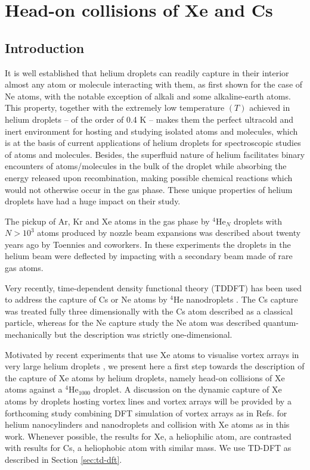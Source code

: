 \chapter{Head-on collisions of Xe and Cs}	
	\section{Introduction}\label{sec:intro-collisions}
		It is well established that helium droplets can readily capture in their interior almost any atom or molecule interacting with them, as first shown for the case of Ne atoms,\citep{Sch90} with the notable exception of alkali\citep{Sti96} and some alkaline-earth\citep{Her07} atoms. This property, together with the extremely low temperature $(T)$ achieved in helium droplets -- of the order of 0.4 K -- makes them the perfect ultracold and inert environment for hosting and studying isolated atoms and molecules, which is at the basis of current applications of helium droplets for spectroscopic studies of atoms and molecules. Besides, the superfluid nature of helium facilitates binary encounters of atoms/molecules in the bulk of the droplet while absorbing the energy released upon recombination, making possible chemical reactions which would not otherwise occur in the gas phase. These unique properties  of helium droplets have had a huge impact on their study.\citep{Toe04,Sti06,Tig07,Cal11a,Mud14}

		The pickup of Ar, Kr and Xe atoms in the gas phase by $^4$He$_N$ droplets with $N> 10^3$ atoms produced by nozzle beam expansions was described about twenty years ago by Toennies and coworkers.\citep{Lew95} In these experiments the droplets in the helium beam were deflected by impacting with a secondary beam made of rare gas atoms. 

		Very recently, time-dependent density functional theory (TDDFT) has been used to address the capture of Cs or Ne atoms by $^4$He nanodroplets \citep{Lea14a,Vil16b}. The Cs capture was treated fully three dimensionally with the Cs atom described as a classical particle, whereas for the Ne capture study the Ne atom was described quantum-mechanically but the description was strictly one-dimensional.
			
		Motivated by recent experiments that use Xe atoms to visualise vortex arrays in very large helium droplets \citep{Gom14,Jon16}, we present here a first step towards the description of the capture  of Xe atoms by helium droplets, namely head-on collisions of Xe atoms against a $^4$He$_{1000}$ droplet. A discussion on the dynamic capture of Xe atoms by droplets hosting vortex lines and vortex arrays will be provided by a forthcoming study combining DFT simulation of vortex arrays as in Refs. for helium nanocylinders and nanodroplets  and collision with Xe atoms as in this work. Whenever possible, the results for Xe, a heliophilic atom,  are contrasted with results for Cs, a heliophobic atom with similar mass. We use TD-DFT as described in Section \ref{sec:td-dft}. 

